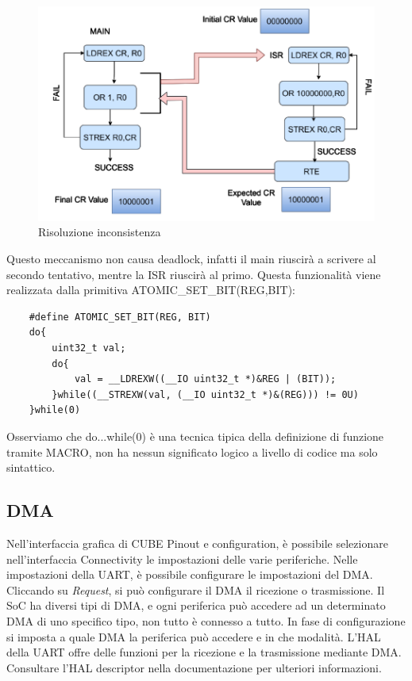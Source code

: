 \begin{figure}[ht]
    \centering
    \includegraphics[width=.7\textwidth]{img/conflict_example_2.png}
    \caption{Risoluzione inconsistenza}
    \label{img:w_conflict_resolve}
\end{figure}

Questo meccanismo non causa deadlock, infatti il main riuscirà a scrivere al secondo tentativo, mentre la ISR riuscirà al primo. 
Questa funzionalità viene realizzata dalla primitiva ATOMIC\_SET\_BIT(REG,BIT):

\begin{lstlisting}
    #define ATOMIC_SET_BIT(REG, BIT)
    do{
        uint32_t val;
        do{
            val = __LDREXW((__IO uint32_t *)&REG | (BIT));
        }while((__STREXW(val, (__IO uint32_t *)&(REG))) != 0U)
    }while(0)
\end{lstlisting}

Osserviamo che do{...}while(0) è una tecnica tipica della definizione di funzione tramite MACRO, non ha nessun significato logico a livello di codice ma solo sintattico. 


\subsection{DMA}
Nell'interfaccia grafica di CUBE Pinout e configuration, è possibile selezionare nell'interfaccia Connectivity le impostazioni delle varie periferiche.
Nelle impostazioni della UART, è possibile configurare le impostazioni del DMA. 
Cliccando su \textit{Request}, si può configurare il DMA il ricezione o trasmissione. Il SoC ha diversi tipi di DMA, e ogni periferica può accedere ad un determinato DMA di uno specifico tipo, non tutto è connesso a tutto. In fase di configurazione si imposta a quale DMA la periferica può accedere e in che modalità. 
L'HAL della UART offre delle funzioni per la ricezione e la trasmissione mediante DMA. Consultare l'HAL descriptor nella documentazione per ulteriori informazioni. 
